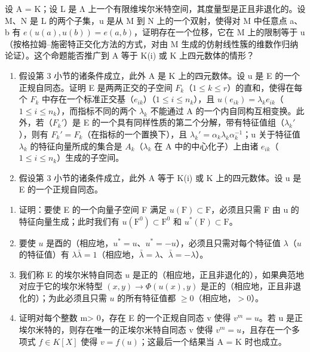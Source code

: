 设 A = K；设 L 是 Λ 上一个有限维埃尔米特空间，其度量型是正且非退化的。设 M、N 是 L 的两个子集，u 是从 M 到 N 上的一个双射，使得对 M 中任意点 a、b 有 \(e(u(a), u(b)) = e(a, b)\)，证明存在一个位移，它在 M 上的限制等于 u（按格拉姆–施密特正交化方法的方式，对由 M 生成的仿射线性簇的维数作归纳论证）。这个命题能否推广到 A 等于 K(i) 或 K 上四元数体的情形？

\begin{enumerate}
\def\labelenumi{\arabic{enumi})}
\setcounter{enumi}{8}
\item
  假设第 3 小节的诸条件成立，此外 A 是 K 上的四元数体。设 u 是 E 的一个正规自同态。证明 E 是两两正交的子空间 \(F_{k}\)（\(1 \leqslant k \leqslant r\)）的直和，使得在每个 \(F_{k}\) 中存在一个标准正交基（\(e_{ik}\)）（\(1 \leqslant i \leqslant n_{k}\)），且 \(u(e_{ik}) = \lambda_{k}e_{ik}\)（\(1 \leqslant i \leqslant n_{k}\)），而指标不同的两个 \(\lambda_{k}\) 不能通过 A 的一个内自同构互相变换。此外，若（\(F_{k}'\)）是 E 的一个具有同样性质的第二个分解，带有特征值组（\(\lambda_{k}'\)），则有 \(F_{k}' = F_{k}\)（在指标的一个置换下），且 \(\lambda_{k}' = \alpha_{k}\lambda_{k}\alpha_{k}^{-1}\)；u 关于特征值 \(\lambda_{k}\) 的特征向量所成的集合是 \(A_{k}\)（\(\lambda_{k}\) 在 A 中的中心化子）上由诸 \(e_{ik}\)（\(1 \leqslant i \leqslant n_{k}\)）生成的子空间。
\item
  假设第 3 小节的诸条件成立，此外 A 等于 K(i) 或 K 上的四元数体。设 u 是 E 的一个正规自同态。
\end{enumerate}

\begin{enumerate}
\def\labelenumi{\alph{enumi})}
\item
  证明：要使 E 的一个向量子空间 F 满足 \(u(\mathrm{F}) \subset \mathrm{F}\)，必须且只需 F 由 u 的特征向量生成；此时我们有 \(u(\mathrm{F}^{0}) \subset \mathrm{F}^{0}\) 和 \(u^{*}(\mathrm{F}) \subset \mathrm{F}\)。
\item
  要使 \(u\) 是酉的（相应地，\(u^{*} = u\)、\(u^{*} = -u\)），必须且只需对每个特征值 \(\lambda\)（\(u\) 的特征值）有 \(\lambda \bar{\lambda} = 1\)（相应地，\(\bar{\lambda} = \lambda\)、\(\bar{\lambda} = -\lambda\)）。
\item
  我们称 E 的埃尔米特自同态 \(u\) 是正的（相应地，正且非退化的），如果典范地对应于它的埃尔米特型 \((x, y) \to \Phi(u(x), y)\) 是正的（相应地，正且非退化的）；为此必须且只需 \(u\) 的所有特征值都 \(\geqslant 0\)（相应地，\(>0\)）。
\item
  证明对每个整数 m\textgreater{} 0，存在 E 的一个正规自同态 v 使得 \(v^{m}=u\)。若 u 是正埃尔米特的，则存在唯一的正埃尔米特自同态 v 使得 \(v^{m}=u\)，且存在一个多项式 \(f\in K[X]\) 使得 \(v=f(u)\)；这最后一个结果当 A = K 时也成立。
\end{enumerate}

